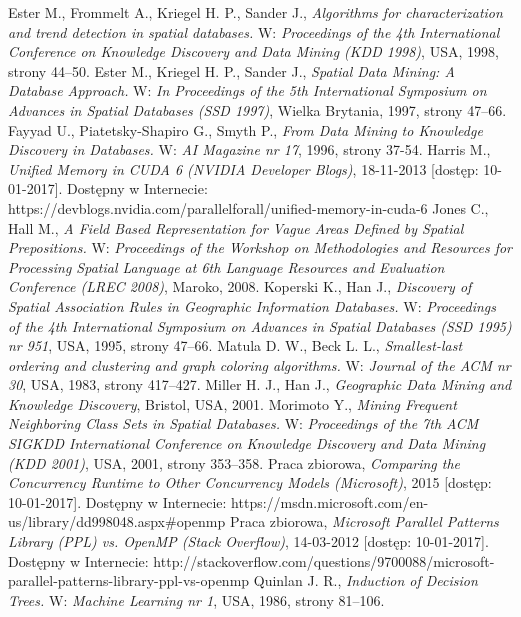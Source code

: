 \documentclass[12pt]{article}
\begin{document}
\begin{thebibliography}{}
Ester M., Frommelt A., Kriegel H. P., Sander J., \textit{Algorithms for characterization and trend detection in spatial databases.} W: \textit{Proceedings of the 4th International Conference on Knowledge Discovery and Data Mining (KDD 1998)}, USA, 1998, strony 44–50.
Ester M., Kriegel H. P., Sander J.,\textit{ Spatial Data Mining: A Database Approach.} W:\textit{ In Proceedings of the 5th International Symposium on Advances in Spatial Databases (SSD 1997)}, Wielka Brytania, 1997, strony 47–66.
Fayyad U., Piatetsky-Shapiro G., Smyth P., \textit{From Data Mining to Knowledge Discovery in Databases.} W: \textit{AI Magazine nr 17}, 1996, strony 37-54.
Harris M., \textit{Unified Memory in CUDA 6 (NVIDIA Developer Blogs)}, 18-11-2013 [dostęp: 10-01-2017]. Dostępny w Internecie: https://devblogs.nvidia.com/parallelforall/unified-memory-in-cuda-6
Jones C., Hall M., \textit{A Field Based Representation for Vague Areas Defined by Spatial Prepositions.} W: \textit{Proceedings of the Workshop on Methodologies and Resources for Processing Spatial Language at 6th Language Resources and Evaluation Conference (LREC 2008)}, Maroko, 2008.
Koperski K., Han J., \textit{Discovery of Spatial Association Rules in Geographic Information Databases.} W: \textit{Proceedings of the 4th International Symposium on Advances in Spatial Databases (SSD 1995) nr 951}, USA, 1995, strony 47–66.
Matula D. W., Beck L. L., \textit{Smallest-last ordering and clustering and graph coloring algorithms.} W: \textit{Journal of the ACM nr 30}, USA, 1983, strony 417–427.
Miller H. J., Han J., \textit{Geographic Data Mining and Knowledge Discovery}, Bristol, USA, 2001.
Morimoto Y., \textit{Mining Frequent Neighboring Class Sets in Spatial Databases.} W: \textit{Proceedings of the 7th ACM SIGKDD International Conference on Knowledge Discovery and Data Mining (KDD 2001)}, USA, 2001, strony 353–358.
Praca zbiorowa, \textit{Comparing the Concurrency Runtime to Other Concurrency Models (Microsoft)}, 2015 [dostęp: 10-01-2017]. Dostępny w Internecie: https://msdn.microsoft.com/en-us/library/dd998048.aspx\#openmp
Praca zbiorowa, \textit{Microsoft Parallel Patterns Library (PPL) vs. OpenMP (Stack Overflow)}, 14-03-2012 [dostęp: 10-01-2017]. Dostępny w Internecie: http://stackoverflow.com/questions/9700088/microsoft-parallel-patterns-library-ppl-vs-openmp
Quinlan J. R., \textit{Induction of Decision Trees.} W: \textit{Machine Learning nr 1}, USA, 1986, strony 81–106.

\end{thebibliography}
\end{document}
